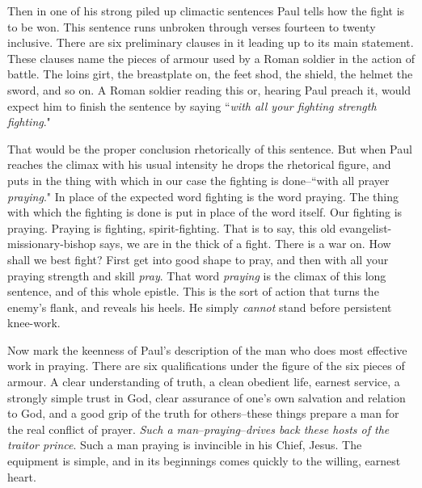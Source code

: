 Then in one of his strong piled up climactic sentences Paul tells how the
fight is to be won. This sentence runs unbroken through verses fourteen to
twenty inclusive. There are six preliminary clauses in it leading up to
its main statement. These clauses name the pieces of armour used by a
Roman soldier in the action of battle. The loins girt, the breastplate on,
the feet shod, the shield, the helmet the sword, and so on. A Roman
soldier reading this or, hearing Paul preach it, would expect him to
finish the sentence by saying ``\textit{with all your fighting strength
fighting}."

That would be the proper conclusion rhetorically of this sentence. But
when Paul reaches the climax with his usual intensity he drops the
rhetorical figure, and puts in the thing with which in our case the
fighting is done--``with all prayer \textit{praying}." In place of the
expected word fighting is the word praying. The thing with which the
fighting is done is put in place of the word itself. Our fighting is
praying. Praying is fighting, spirit-fighting. That is to say, this old
evangelist-missionary-bishop says, we are in the thick of a fight. There
is a war on. How shall we best fight? First get into good shape to pray,
and then with all your praying strength and skill \textit{pray}. That word
\textit{praying} is the climax of this long sentence, and of this whole epistle.
This is the sort of action that turns the enemy's flank, and reveals his
heels. He simply \textit{cannot} stand before persistent knee-work.

Now mark the keenness of Paul's description of the man who does most
effective work in praying. There are six qualifications under the figure
of the six pieces of armour. A clear understanding of truth, a clean
obedient life, earnest service, a strongly simple trust in God, clear
assurance of one's own salvation and relation to God, and a good grip of
the truth for others--these things prepare a man for the real conflict of
prayer. \textit{Such a man}--\textit{praying}--\textit{drives back these hosts of the traitor
prince}. Such a man praying is invincible in his Chief, Jesus. The
equipment is simple, and in its beginnings comes quickly to the willing,
earnest heart.

